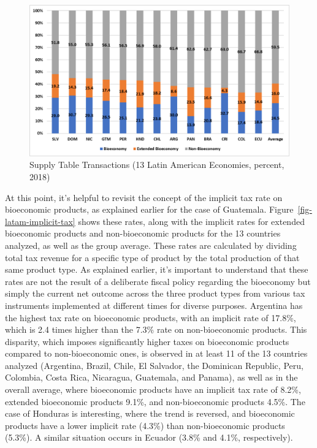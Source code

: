 \documentclass[
  letterpaper,
  DIV=11,
  numbers=noendperiod]{scrartcl}
\begin{document}
\begin{figure}
\begin{minipage}{\linewidth}
{\includegraphics{images/clipboard-1372132090.png}

}


\end{minipage}%

\caption{\label{fig-latam-output}Supply Table Transactions (13 Latin
American Economies, percent, 2018)}

\end{figure}%

At this point, it's helpful to revisit the concept of the implicit tax
rate on bioeconomic products, as explained earlier for the case of
Guatemala. Figure~\ref{fig-latam-implicit-tax} shows these rates, along
with the implicit rates for extended bioeconomic products and
non-bioeconomic products for the 13 countries analyzed, as well as the
group average. These rates are calculated by dividing total tax revenue
for a specific type of product by the total production of that same
product type. As explained earlier, it's important to understand that
these rates are not the result of a deliberate fiscal policy regarding
the bioeconomy but simply the current net outcome across the three
product types from various tax instruments implemented at different
times for diverse purposes. Argentina has the highest tax rate on
bioeconomic products, with an implicit rate of 17.8\%, which is 2.4
times higher than the 7.3\% rate on non-bioeconomic products. This
disparity, which imposes significantly higher taxes on bioeconomic
products compared to non-bioeconomic ones, is observed in at least 11 of
the 13 countries analyzed (Argentina, Brazil, Chile, El Salvador, the
Dominican Republic, Peru, Colombia, Costa Rica, Nicaragua, Guatemala,
and Panama), as well as in the overall average, where bioeconomic
products have an implicit tax rate of 8.2\%, extended bioeconomic
products 9.1\%, and non-bioeconomic products 4.5\%. The case of Honduras
is interesting, where the trend is reversed, and bioeconomic products
have a lower implicit rate (4.3\%) than non-bioeconomic products
(5.3\%). A similar situation occurs in Ecuador (3.8\% and 4.1\%,
respectively).
\end{document}
